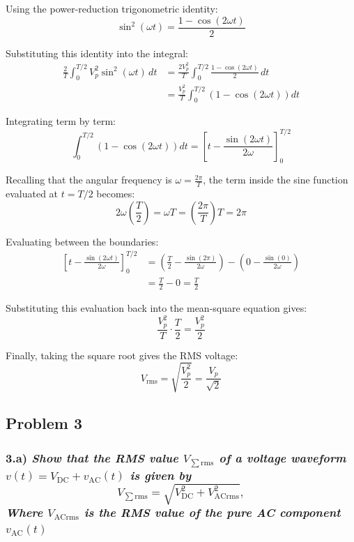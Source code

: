 Using the power-reduction trigonometric identity:
\begin{equation*}
    \sin^2(\omega t) = \frac{1 - \cos(2\omega t)}{2}
\end{equation*}

Substituting this identity into the integral:
\begin{align}
    \frac{2}{T} \int_{0}^{T/2} V_p^2 \sin^2(\omega t) \, dt &= \frac{2 V_p^2}{T} \int_{0}^{T/2} \frac{1 - \cos(2\omega t)}{2} \, dt \\
    &= \frac{V_p^2}{T} \int_{0}^{T/2} \left( 1 - \cos(2\omega t) \right) dt
\end{align}

Integrating term by term:
\begin{equation*}
    \int_{0}^{T/2} \left( 1 - \cos(2\omega t) \right) dt = \left[ t - \frac{\sin(2\omega t)}{2\omega} \right]_{0}^{T/2}
\end{equation*}

Recalling that the angular frequency is $\omega = \frac{2\pi}{T}$, the term inside the sine function evaluated at $t = T/2$ becomes:
\begin{equation*}
    2\omega \left(\frac{T}{2}\right) = \omega T = \left(\frac{2\pi}{T}\right) T = 2\pi
\end{equation*}

Evaluating between the boundaries:
\begin{align}
    \left[ t - \frac{\sin(2\omega t)}{2\omega} \right]_{0}^{T/2} &= \left( \frac{T}{2} - \frac{\sin(2\pi)}{2\omega} \right) - \left( 0 - \frac{\sin(0)}{2\omega} \right) \\
    &= \frac{T}{2} - 0 = \frac{T}{2}
\end{align}

Substituting this evaluation back into the mean-square equation gives:
\begin{equation*}
    \frac{V_p^2}{T} \cdot \frac{T}{2} = \frac{V_p^2}{2}
\end{equation*}

Finally, taking the square root gives the RMS voltage:
\begin{equation*}
    V_{\text{rms}} = \sqrt{\frac{V_p^2}{2}} = \frac{V_p}{\sqrt{2}}
\end{equation*}

\clearpage
\subsection*{Problem 3}
\subsubsection*{3.a) \normalfont\itshape Show that the RMS value $V_\mathrm{\sum rms}$ of a voltage waveform $v(t) = V_\mathrm{DC} + v_\mathrm{AC}(t)$ is given by
\begin{equation*}
    V_\mathrm{\sum rms} = \sqrt{V_\mathrm{DC}^2 + V_\mathrm{ACrms}^2},
\end{equation*}
Where $V_\mathrm{ACrms}$ is the RMS value of the pure AC component $v_\mathrm{AC}(t)$}

